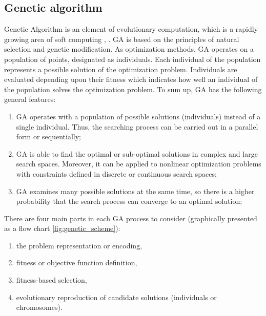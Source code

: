 \subsection{Genetic algorithm}
\label{cha:Genetic_algorithm}
Genetic Algorithm is an element of evolutionary computation, which is a 
rapidly growing area of soft computing \cite{bib42}, \cite{bib43}. GA is based on the principles of
natural selection and genetic modification. As optimization methods, GA 
operates on a population of points, designated as individuals. Each 
individual of the population represents a possible solution of the 
optimization problem. Individuals are evaluated depending upon their 
fitness which indicates how well an individual of the population solves 
the optimization problem. To sum up, GA has the following general features:
\begin{enumerate}
    \item GA operates with a population of possible solutions (individuals) 
        instead of a single individual. Thus, the searching process can be 
        carried out in a parallel form or sequentially;
    \item GA is able to find the optimal or sub-optimal solutions in complex
        and large search spaces. Moreover, it can be applied to nonlinear 
        optimization problems with constraints defined in discrete or continuous 
        search spaces;
    \item GA examines many possible solutions at the same time, so there is a 
        higher probability that the search process can converge to an optimal
        solution;
\end{enumerate}
There are four main parts in each GA process to consider (graphically
presented as a flow chart \ref{fig:genetic_scheme}):
\begin{enumerate}
    \item the problem representation or encoding,
    \item fitness or objective function definition,
    \item fitness-based selection,
    \item evolutionary reproduction of candidate solutions (individuals or
        chromosomes).
\end{enumerate}
